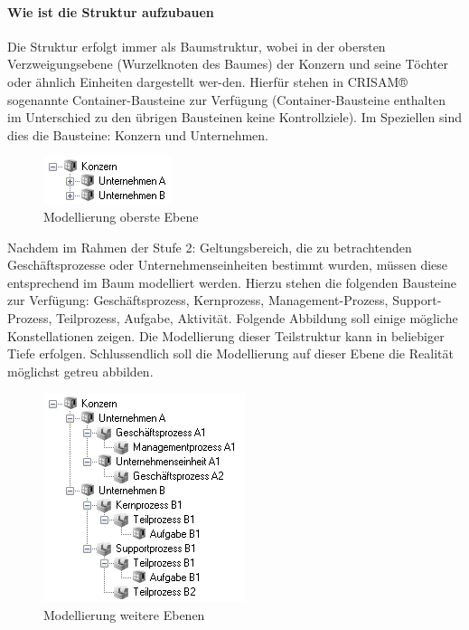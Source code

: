 \paragraph{Wie ist die Struktur aufzubauen}
Die Struktur erfolgt immer als Baumstruktur, wobei in der obersten Verzweigungsebene (Wurzelknoten des Baumes) der Konzern und seine Töchter oder ähnlich Einheiten dargestellt wer-den. Hierfür stehen in CRISAM® sogenannte Container-Bausteine zur Verfügung (Container-Bausteine enthalten im Unterschied zu den übrigen Bausteinen keine Kontrollziele). Im Speziellen sind dies die Bausteine: Konzern und Unternehmen.

\begin{figure}[htbp]
	\centering
	\includegraphics[scale =1 ]{images/Modellierung.png}
	\caption{Modellierung oberste Ebene}
	\label{fig:bsp}
\end{figure}
Nachdem im Rahmen der Stufe 2: Geltungsbereich, die zu betrachtenden Geschäftsprozesse oder Unternehmenseinheiten bestimmt wurden, müssen diese entsprechend im Baum modelliert werden. Hierzu stehen die folgenden Bausteine zur Verfügung: Geschäftsprozess, Kernprozess, Management-Prozess, Support-Prozess, Teilprozess, Aufgabe, Aktivität.
Folgende Abbildung soll einige mögliche Konstellationen zeigen. Die Modellierung dieser Teilstruktur kann in beliebiger Tiefe erfolgen. Schlussendlich soll die Modellierung auf dieser Ebene die Realität möglichst getreu abbilden.

\begin{figure}[htbp]
	\centering
	\includegraphics[scale =1 ]{images/weiterebenen.png}
	\caption{Modellierung weitere Ebenen}
	\label{fig:bsp}
\end{figure}

